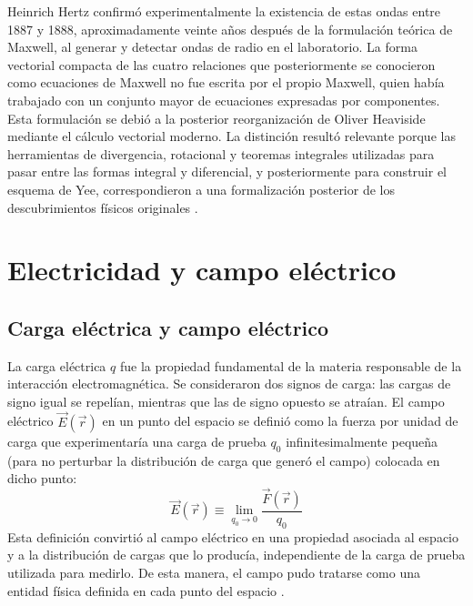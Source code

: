 Heinrich Hertz confirmó experimentalmente la existencia de estas ondas entre 1887 y 1888, aproximadamente veinte años después de la formulación teórica de Maxwell, al generar y detectar ondas de radio en el laboratorio. La forma vectorial compacta de las cuatro relaciones que posteriormente se conocieron como ecuaciones de Maxwell no fue escrita por el propio Maxwell, quien había trabajado con un conjunto mayor de ecuaciones expresadas por componentes. Esta formulación se debió a la posterior reorganización de Oliver Heaviside mediante el cálculo vectorial moderno. La distinción resultó relevante porque las herramientas de divergencia, rotacional y teoremas integrales utilizadas para pasar entre las formas integral y diferencial, y posteriormente para construir el esquema de Yee, correspondieron a una formalización posterior de los descubrimientos físicos originales \cite{Fumeron2020}.

\section{Electricidad y campo eléctrico}

\subsection{Carga eléctrica y campo eléctrico}
La carga eléctrica $q$ fue la propiedad fundamental de la materia responsable de la interacción electromagnética. Se consideraron dos signos de carga: las cargas de signo igual se repelían, mientras que las de signo opuesto se atraían. El campo eléctrico $\vec{E}(\vec{r})$ en un punto del espacio se definió como la fuerza por unidad de carga que experimentaría una carga de prueba $q_0$ infinitesimalmente pequeña (para no perturbar la distribución de carga que generó el campo) colocada en dicho punto:
\begin{equation}
    \vec{E}(\vec{r}) \equiv \lim_{q_0 \to 0} \frac{\vec{F}(\vec{r})}{q_0}
\end{equation}
Esta definición convirtió al campo eléctrico en una propiedad asociada al espacio y a la distribución de cargas que lo producía, independiente de la carga de prueba utilizada para medirlo. De esta manera, el campo pudo tratarse como una entidad física definida en cada punto del espacio \cite{Griffiths2017}.

